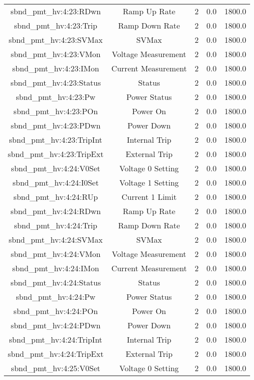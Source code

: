 \begin{table}[ptb]
\begin{tabular}{c | c c c c}
sbnd_pmt_hv:4:23:RDwn & Ramp Up Rate & 2 & 0.0 & 1800.0\\ 
sbnd_pmt_hv:4:23:Trip & Ramp Down Rate & 2 & 0.0 & 1800.0\\ 
sbnd_pmt_hv:4:23:SVMax & SVMax & 2 & 0.0 & 1800.0\\ 
sbnd_pmt_hv:4:23:VMon & Voltage Measurement & 2 & 0.0 & 1800.0\\ 
sbnd_pmt_hv:4:23:IMon & Current Measurement & 2 & 0.0 & 1800.0\\ 
sbnd_pmt_hv:4:23:Status & Status & 2 & 0.0 & 1800.0\\ 
sbnd_pmt_hv:4:23:Pw & Power Status & 2 & 0.0 & 1800.0\\ 
sbnd_pmt_hv:4:23:POn & Power On & 2 & 0.0 & 1800.0\\ 
sbnd_pmt_hv:4:23:PDwn & Power Down & 2 & 0.0 & 1800.0\\ 
sbnd_pmt_hv:4:23:TripInt & Internal Trip & 2 & 0.0 & 1800.0\\ 
sbnd_pmt_hv:4:23:TripExt & External Trip & 2 & 0.0 & 1800.0\\ 
sbnd_pmt_hv:4:24:V0Set & Voltage 0 Setting & 2 & 0.0 & 1800.0\\ 
sbnd_pmt_hv:4:24:I0Set & Voltage 1 Setting & 2 & 0.0 & 1800.0\\ 
sbnd_pmt_hv:4:24:RUp & Current 1 Limit & 2 & 0.0 & 1800.0\\ 
sbnd_pmt_hv:4:24:RDwn & Ramp Up Rate & 2 & 0.0 & 1800.0\\ 
sbnd_pmt_hv:4:24:Trip & Ramp Down Rate & 2 & 0.0 & 1800.0\\ 
sbnd_pmt_hv:4:24:SVMax & SVMax & 2 & 0.0 & 1800.0\\ 
sbnd_pmt_hv:4:24:VMon & Voltage Measurement & 2 & 0.0 & 1800.0\\ 
sbnd_pmt_hv:4:24:IMon & Current Measurement & 2 & 0.0 & 1800.0\\ 
sbnd_pmt_hv:4:24:Status & Status & 2 & 0.0 & 1800.0\\ 
sbnd_pmt_hv:4:24:Pw & Power Status & 2 & 0.0 & 1800.0\\ 
sbnd_pmt_hv:4:24:POn & Power On & 2 & 0.0 & 1800.0\\ 
sbnd_pmt_hv:4:24:PDwn & Power Down & 2 & 0.0 & 1800.0\\ 
sbnd_pmt_hv:4:24:TripInt & Internal Trip & 2 & 0.0 & 1800.0\\ 
sbnd_pmt_hv:4:24:TripExt & External Trip & 2 & 0.0 & 1800.0\\ 
sbnd_pmt_hv:4:25:V0Set & Voltage 0 Setting & 2 & 0.0 & 1800.0\\ 

\end{tabular}
\end{table}
